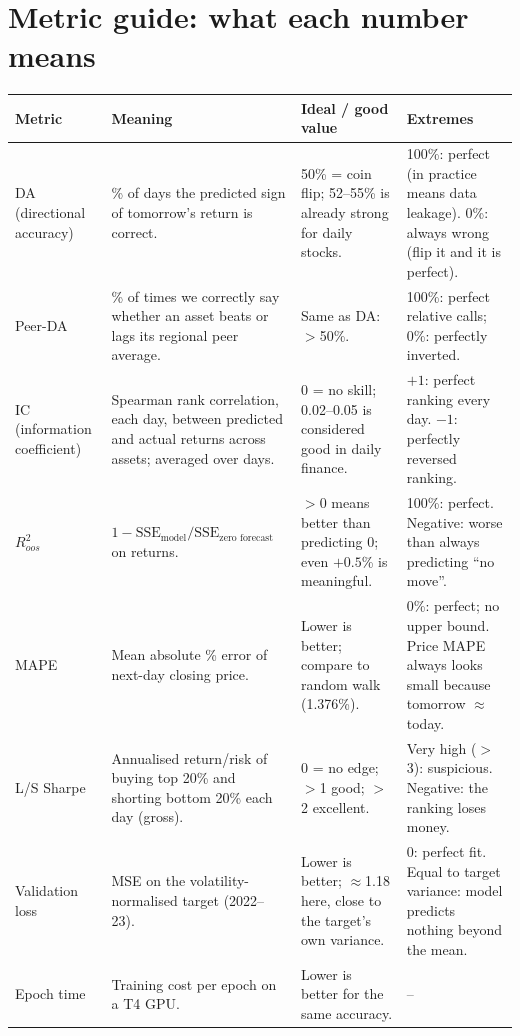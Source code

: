 \documentclass[10pt,a4paper]{article}
\begin{document}
\section{Metric guide: what each number means}
\begin{center}\footnotesize
\begin{tabularx}{\linewidth}{@{}p{2.1cm}Xp{3.0cm}X@{}}
\toprule
\textbf{Metric} & \textbf{Meaning} & \textbf{Ideal / good value} & \textbf{Extremes}\\\midrule
DA (directional accuracy) & \% of days the predicted sign of tomorrow's return is correct. & 50\% = coin flip; 52--55\% is already strong for daily stocks. & 100\%: perfect (in practice means data leakage). 0\%: always wrong (flip it and it is perfect).\\
Peer-DA & \% of times we correctly say whether an asset beats or lags its regional peer average. & Same as DA: $>$50\%. & 100\%: perfect relative calls; 0\%: perfectly inverted.\\
IC (information coefficient) & Spearman rank correlation, each day, between predicted and actual returns across assets; averaged over days. & 0 = no skill; 0.02--0.05 is considered good in daily finance. & $+1$: perfect ranking every day. $-1$: perfectly reversed ranking.\\
$R^2_{oos}$ & $1-\mathrm{SSE}_{\text{model}}/\mathrm{SSE}_{\text{zero forecast}}$ on returns. & $>0$ means better than predicting 0; even $+0.5$\% is meaningful. & 100\%: perfect. Negative: worse than always predicting ``no move''.\\
MAPE & Mean absolute \% error of next-day closing price. & Lower is better; compare to random walk (1.376\%). & 0\%: perfect; no upper bound. Price MAPE always looks small because tomorrow $\approx$ today.\\
L/S Sharpe & Annualised return/risk of buying top 20\% and shorting bottom 20\% each day (gross). & 0 = no edge; $>$1 good; $>$2 excellent. & Very high ($>$3): suspicious. Negative: the ranking loses money.\\
Validation loss & MSE on the volatility-normalised target (2022--23). & Lower is better; $\approx$1.18 here, close to the target's own variance. & 0: perfect fit. Equal to target variance: model predicts nothing beyond the mean.\\
Epoch time & Training cost per epoch on a T4 GPU. & Lower is better for the same accuracy. & --\\\bottomrule
\end{tabularx}
\end{center}
\end{document}
